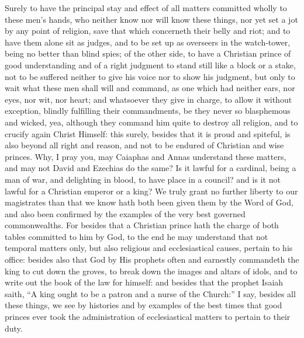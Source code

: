 Surely
to have the principal stay and effect of all matters committed wholly
to these men’s hands, who neither know nor will know these things,
nor yet set a jot by any point of religion, save that which concerneth
their belly and riot; and to have them alone sit as judges, and to be
set up as overseers in the watch-tower, being no better than blind spies;
of the other side, to have a Christian prince of good understanding
and of a right judgment to stand still like a block or a stake, not
to be suffered neither to give his voice nor to show his judgment, but
only to wait what these men shall will and command, as one which had
neither ears, nor eyes, nor wit, nor heart; and whatsoever they give
in charge, to allow it without exception, blindly fulfilling their commandments,
be they never so blasphemous and wicked, yea, although they command
him quite to destroy all religion, and to crucify again Christ Himself:
this surely, besides that it is proud and spiteful, is also beyond all
right and reason, and not to be endured of Christian and wise princes.
Why, I pray you, may Caiaphas and Annas understand these matters, and
may not David and Ezechias do the same? Is it lawful for a cardinal,
being a man of war, and delighting in blood, to have place in a council?
and is it not lawful for a Christian
emperor or a king? We truly grant no further liberty to our magistrates
than that we know hath both been given them by the Word of God, and
also been confirmed by the examples of the very best governed commonwealths.
For besides that a Christian prince hath the charge of both tables committed
to him by God, to the end he may understand that not temporal matters
only, but also religious and ecclesiastical causes, pertain to his office:
besides also that God by His prophets often and earnestly commandeth
the king to cut down the groves, to break down the images and altars
of idols, and to write out the book of the law for himself: and besides
that the prophet Isaiah saith, “A king ought to be a patron and
a nurse of the Church:” I say, besides all these things, we see
by histories and by examples of the best times that good princes ever
took the administration of ecclesiastical matters to pertain to their
duty.

